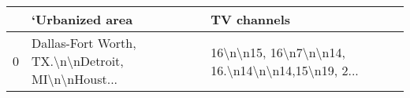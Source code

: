 \begin{tabular}{lll}
\toprule
{} &                                    ‘Urbanized area &                                        TV channels \\
\midrule
0 &  Dallas-Fort Worth, TX.\textbackslash n\textbackslash nDetroit, MI\textbackslash n\textbackslash nHoust... &  16\textbackslash n\textbackslash n15, 16\textbackslash n7\textbackslash n\textbackslash n14, 16.\textbackslash n14\textbackslash n\textbackslash n14,15\textbackslash n19, 2... \\
\bottomrule
\end{tabular}
